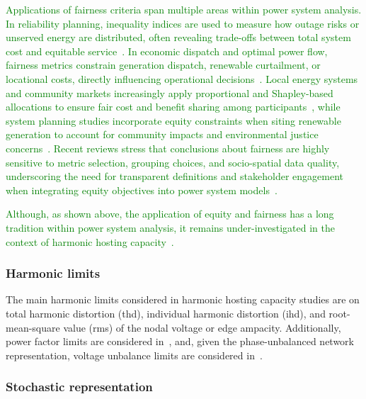 \textcolor{green}{Applications of fairness criteria span multiple areas within power system analysis. In reliability planning, inequality indices are used to measure how outage risks or unserved energy are distributed, often revealing trade-offs between total system cost and equitable service~\cite{heylen_fairness_2019}. In economic dispatch and optimal power flow, fairness metrics constrain generation dispatch, renewable curtailment, or locational costs, directly influencing operational decisions~\cite{sun_gini_2020}. Local energy systems and community markets increasingly apply proportional and Shapley-based allocations to ensure fair cost and benefit sharing among participants~\cite{obrien_shapley_2015}, while system planning studies incorporate equity constraints when siting renewable generation to account for community impacts and environmental justice concerns~\cite{lohr_integration_2024}. Recent reviews stress that conclusions about fairness are highly sensitive to metric selection, grouping choices, and socio-spatial data quality, underscoring the need for transparent definitions and stakeholder engagement when integrating equity objectives into power system models~\cite{goforth_incorporating_2025}.}

\textcolor{green}{Although, as shown above, the application of equity and fairness has a long tradition within power system analysis, it remains under-investigated in the context of harmonic hosting capacity~\cite{santos_considerations_2015}.}

\subsubsection{Harmonic limits}
\label{sec:harmonic_limits}

The main harmonic limits considered in harmonic hosting capacity studies are on total harmonic distortion (thd), individual harmonic distortion (ihd), and root-mean-square value (rms) of the nodal voltage or edge ampacity. Additionally, power factor limits are considered in~\cite{sakar_integration_2018}, and, given the phase-unbalanced network representation, voltage unbalance limits are considered in~\cite{carmelito_hosting_2023}.

\subsubsection{Stochastic representation}
\label{sec:stochastic_representation}

